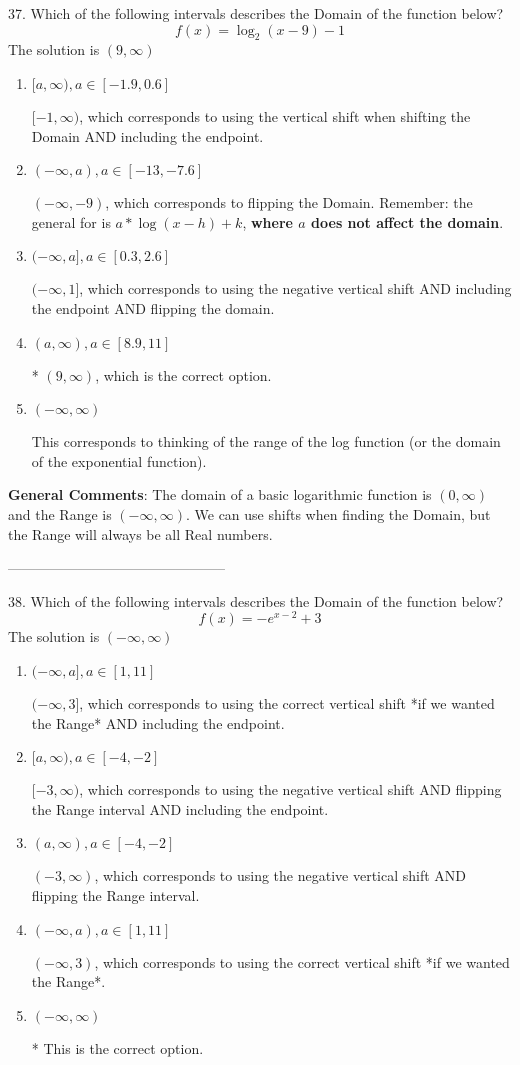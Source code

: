 \documentclass{article}[14pt]
\begin{document}
37. Which of the following intervals describes the Domain of the function below?
$$ f(x) = \log_2{(x-9)}-1 $$ 
The solution is $ (9, \infty) $ 

\begin{enumerate}[label=\Alph*.] 
\item $ [a, \infty), a \in [-1.9, 0.6] $ 

 $[-1, \infty)$, which corresponds to using the vertical shift when shifting the Domain AND including the endpoint. 
\item $ (-\infty, a), a \in [-13, -7.6] $ 

 $(-\infty, -9)$, which corresponds to flipping the Domain. Remember: the general for is $a*\log(x-h)+k$, \textbf{where $a$ does not affect the domain}. 
\item $ (-\infty, a], a \in [0.3, 2.6] $ 

 $(-\infty, 1]$, which corresponds to using the negative vertical shift AND including the endpoint AND flipping the domain. 
\item $ (a, \infty), a \in [8.9, 11] $ 

 * $(9, \infty)$, which is the correct option. 
\item $ (-\infty, \infty) $ 

 This corresponds to thinking of the range of the log function (or the domain of the exponential function). 
\end{enumerate} 
 
\textbf{General Comments}: The domain of a basic logarithmic function is $(0, \infty)$ and the Range is $(-\infty, \infty)$. We can use shifts when finding the Domain, but the Range will always be all Real numbers.

-----------------------------------------------

38. Which of the following intervals describes the Domain of the function below?
$$ f(x) = -e^{x-2}+3 $$ 
The solution is $ (-\infty, \infty) $ 

\begin{enumerate}[label=\Alph*.] 
\item $ (-\infty, a], a \in [1, 11] $ 

 $(-\infty, 3]$, which corresponds to using the correct vertical shift *if we wanted the Range* AND including the endpoint. 
\item $ [a, \infty), a \in [-4, -2] $ 

 $[-3, \infty)$, which corresponds to using the negative vertical shift AND flipping the Range interval AND including the endpoint. 
\item $ (a, \infty), a \in [-4, -2] $ 

 $(-3, \infty)$, which corresponds to using the negative vertical shift AND flipping the Range interval. 
\item $ (-\infty, a), a \in [1, 11] $ 

 $(-\infty, 3)$, which corresponds to using the correct vertical shift *if we wanted the Range*. 
\item $ (-\infty, \infty) $ 

 * This is the correct option. 
\end{enumerate} 
 
\end{document}
